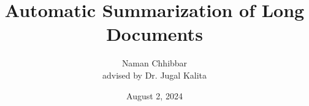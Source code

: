 \documentclass{beamer}
\title{Automatic Summarization of Long Documents}
\author[Naman Chhibbar]{
  Naman Chhibbar \\
  \scriptsize advised by Dr. Jugal Kalita
}
\institute{University of Colorado, Colorado Springs}
\date{August 2, 2024}
\begin{document}
  \begin{frame}
    \titlepage
  \end{frame}

  
  
  
  
  
  
  
  
\end{document}

